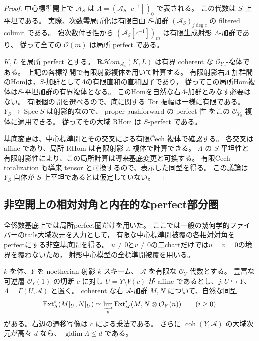 \begin{proof}
中心標準開上で $\mathscr A_S$ は
$\Lambda=(\mathcal A_S[c^{-1}])_0$ で表される。
この代数は $S$ 上平坦である。
実際、次数零局所化は有限自由 $S$-加群
$(\mathcal A_S)_{j\deg c}$ の filtered colimit である。
強次数付き性から $(\mathcal A_S[c^{-1}])_m$ は有限生成射影 $\Lambda$-加群であり、
従って全ての $\mathcal O(m)$ は局所 perfect である。

$K,L$ を局所 perfect とする。
$\mathbf R\mathcal Hom_{\mathscr A_S}(K,L)$ は有界 coherent な
$\mathcal O_{Y_S}$-複体である。
上記の各標準開で有限射影複体を用いて計算する。
有限射影右$\Lambda$-加群間のHomは，$S$-加群として$\Lambda$の有限直和の直和因子であり，
従ってこの局所Hom複体は$S$-平坦加群の有界複体となる。
このHomを自然な右$\Lambda$-加群とみなす必要はない。
有限個の開を選べるので、底に関する Tor 振幅は一様に有限である。
$Y_S\to\operatorname{Spec}S$ は射影的なので、
proper pushforward の perfect 性
\cite[Lemma 36.27.1, Tag~08EV]{StacksPerfect}
をこの $\mathcal O_{Y_S}$-複体に適用できる。
従ってその大域 RHom は $S$-perfect である。

基底変更は、中心標準開とその交叉による有限\v{C}ech 複体で確認する。
各交叉は affine であり、局所 RHom は有限射影 $\Lambda$-複体で計算できる。
$\Lambda$ の $S$-平坦性と有限射影性により、この局所計算は導来基底変更と可換する。
有限\v{C}ech totalization も導来 tensor と可換するので、表示した同型を得る。
この議論は $Y_S$ 自体が $S$ 上平坦であるとは仮定していない。
\end{proof}

\subsection{非空開上の相対対角と内在的なperfect部分圏}

全係数基底上では局所perfect圏だけを用いた。
ここでは一般の幾何学的ファイバーのtails大域次元を入力として，
有限な中心標準開被覆の各相対対角をperfectにする非空基底開を得る。
$u\ne0$と$v\ne0$の二chartだけでは$u=v=0$の境界を覆わないため，
射影中心模型の全標準開被覆を用いる。

\begin{lemma}
\label{lem:central-affine-ext-localization}
$k$ を体、$Y$ を noetherian 射影 $k$-スキーム、
$\mathscr A$ を有限な $\mathcal O_Y$-代数とする。
豊富な可逆層 $\mathcal O_Y(1)$ の切断 $c$ に対し
$U=Y\setminus V(c)$ が affine であるとし、$j:U\hookrightarrow Y$、
$\Lambda=\Gamma(U,\mathscr A)$ と置く。
coherent な右 $\mathscr A$-加群 $M,N$ について、自然な同型
\[
 \operatorname{Ext}^i_\Lambda(M|_U,N|_U)
 \simeq\varinjlim_n
 \operatorname{Ext}^i_{\mathscr A}(M,N\otimes\mathcal O_Y(n))
 \qquad(i\geq0)
\]
がある。右辺の遷移写像は $c$ による乗法である。
さらに $\operatorname{coh}(Y,\mathscr A)$ の大域次元が高々 $d$ なら、
$\operatorname{gldim}\Lambda\leq d$ である。
\end{lemma}

